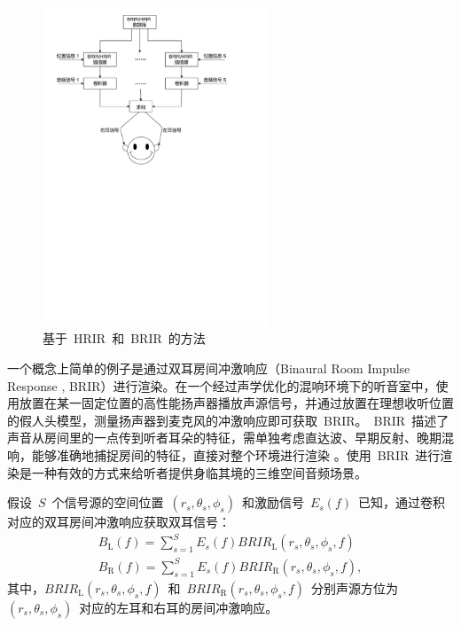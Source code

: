 \begin{figure}[H]
\centering
\includegraphics[width=0.6\textwidth]{figure/chapter2/rendering_based_HRIR_BRIR}
\caption{基于~HRIR~和~BRIR~的方法}
\label{fig:BRS}
\end{figure}

一个概念上简单的例子是通过双耳房间冲激响应（Binaural Room Impulse Response , BRIR）进行渲染。在一个经过声学优化的混响环境下的听音室中，使用放置在某一固定位置的高性能扬声器播放声源信号，并通过放置在理想收听位置的假人头模型，测量扬声器到麦克风的冲激响应即可获取~BRIR。~BRIR~描述了声音从房间里的一点传到听者耳朵的特征，需单独考虑直达波、早期反射、晚期混响，能够准确地捕捉房间的特征，直接对整个环境进行渲染 。使用~BRIR~进行渲染是一种有效的方式来给听者提供身临其境的三维空间音频场景。


假设~$S$~个信号源的空间位置~$(r_{s},\theta_{s},\phi_{s})$~和激励信号~$E_{s}(f)$~已知，通过卷积对应的双耳房间冲激响应获取双耳信号：
\begin{equation}
\begin{split}
B_{\text{L}}(f) = \sum_{s=1}^{S} E_{s}(f)BRIR_{\text{L}}(r_{s},\theta_{s},\phi_{s},f)\\
B_{\text{R}}(f) = \sum_{s=1}^{S} E_{s}(f)BRIR_{\text{R}}(r_{s},\theta_{s},\phi_{s},f),
\end{split}
\end{equation}
其中，$BRIR_{\text{L}}(r_{s},\theta_{s},\phi_{s},f)$~和~$BRIR_{\text{R}}(r_{s},\theta_{s},\phi_{s},f)$~分别声源方位为~$(r_{s},\theta_{s},\phi_{s})$~对应的左耳和右耳的房间冲激响应。



